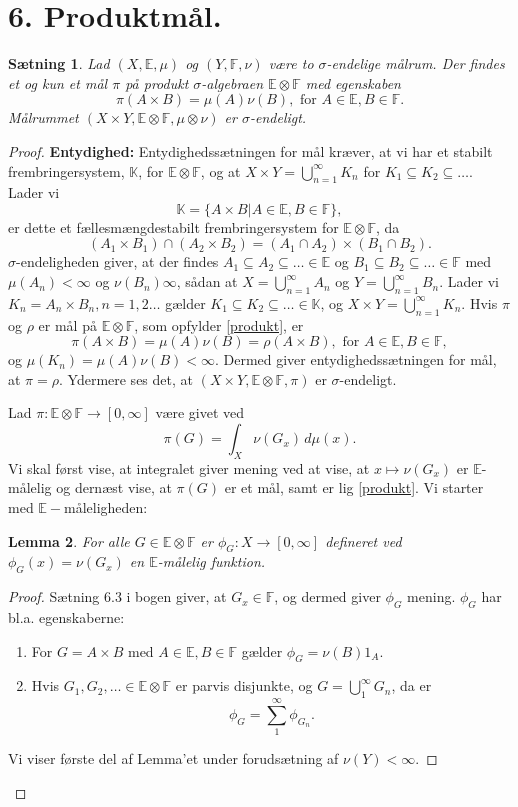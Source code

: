 \documentclass[12pt]{report}
\newtheorem{lemma}{Lemma}
\newtheorem{theorem}[lemma]{Sætning}
\theoremstyle{break}
\newtheorem*{proof}{Bevis}
\theoremstyle{break}
\newcommand{\EE}{\mathbb{E}}
\newcommand{\FF}{\mathbb{F}}
\newcommand{\K}{\mathbb{K}}
\begin{document}
\newpage
\section*{6. Produktmål.}
\begin{theorem}
Lad $(X,\EE,\mu)$ og $(Y,\FF,\nu)$ være to $\sigma$-endelige målrum. Der findes et og kun et mål $\pi$ på produkt $\sigma$-algebraen $\EE\otimes\FF$ med egenskaben
\begin{equation}\label{produkt}
\pi(A\times B)=\mu(A)\nu(B), \text{ for } A\in\EE, B\in\FF.
\end{equation}
Målrummet $(X\times Y,\EE\otimes\FF,\mu\otimes\nu)$ er $\sigma$-endeligt.
\end{theorem}
\begin{proof}
{\bf{Entydighed:}} Entydighedssætningen for mål kræver, at vi har et stabilt frembringersystem, $\K$, for $\EE\otimes\FF$, og at $X\times Y = \bigcup_{n = 1}^\infty  {K_n}$ for $K_1\subseteq K_2\subseteq\ldots$.
Lader vi
\[\K = \{A\times B\vert A\in\EE,B\in\FF\},\]
er dette et fællesmængdestabilt frembringersystem for $\EE\otimes\FF$, da
\[\left(A_1\times B_1\right)\cap\left(A_2\times B_2\right) = \left(A_1\cap A_2\right)\times\left(B_1\cap B_2\right).\]
$\sigma$-endeligheden giver, at der findes $A_1\subseteq A_2\subseteq\ldots\in\EE$ og $B_1\subseteq B_2\subseteq\ldots\in\FF$ med $\mu(A_n)<\infty$ og $\nu(B_n)\infty$, sådan at $X = \bigcup_{n = 1}^\infty  {A_n}$ og $Y=\bigcup_{n=1}^\infty {B_n}$. Lader vi $K_n=A_n\times B_n, n=1,2\ldots$ gælder $K_1\subseteq K_2\subseteq\ldots\in\K$, og $X\times Y=\bigcup_{n=1}^\infty K_n$. Hvis $\pi$ og $\rho$ er mål på $\EE\otimes\FF$, som opfylder \eqref{produkt}, er
\[\pi(A\times B)=\mu(A)\nu(B)=\rho(A\times B), \text{ for }A\in\EE,B\in\FF,\]
og $\mu(K_n)=\mu(A)\nu(B)<\infty.$ Dermed giver entydighedssætningen for mål, at $\pi=\rho$. Ydermere ses det, at $(X\times Y,\EE\otimes\FF,\pi)$ er $\sigma$-endeligt.

\bigskip 

 Lad $\pi\colon\EE\otimes\FF\to[0,\infty]$ være givet ved
\[\pi(G)=\int_X\nu(G_x)\,d\mu(x).\]
Vi skal først vise, at integralet giver mening ved at vise, at $x\mapsto\nu(G_x)$ er $\EE$-målelig og dernæst vise, at $\pi(G)$ er et mål, samt er lig \eqref{produkt}. Vi starter med $\EE-$måleligheden:
\begin{lemma}
For alle $G\in\EE\otimes\FF$ er $\phi_G\colon X\to[0,\infty]$ defineret ved $\phi_G(x)=\nu(G_x)$ en $\EE$-målelig funktion.
\end{lemma}
\begin{proof}
Sætning 6.3 i bogen giver, at $G_x\in\FF$, og dermed giver $\phi_G$ mening. $\phi_G$ har bl.a. egenskaberne:
\begin{enumerate}[label=(\alph*)]
\item For $G=A\times B$ med $A\in\EE, B\in\FF$ gælder $\phi_G = \nu(B)1_A$.
\item Hvis $G_1,G_2,\ldots\in\EE\otimes\FF$ er parvis disjunkte, og $G=\bigcup_1^\infty G_n$, da er \[\phi_G = \sum\limits_1^\infty\phi_{G_n}.\] 
\end{enumerate}
Vi viser første del af Lemma'et under forudsætning af $\nu(Y)<\infty$.


\end{proof}
\end{proof}
\end{document}

